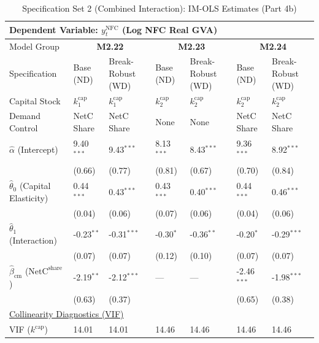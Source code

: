 \begin{table}[H]
\centering
\caption{Specification Set 2 (Combined Interaction): IM-OLS Estimates (Part 4b)}
\label{tab:spec_set_2_p4b}
\scriptsize
\begin{tabular}{p{3.8cm}p{2.1cm}p{2.1cm}p{2.1cm}p{2.1cm}p{2.1cm}p{2.1cm}}
\toprule
\multicolumn{7}{l}{\textbf{Dependent Variable: $y_t^{\text{NFC}}$ (Log NFC Real GVA)}} \\
\midrule
Model Group & \multicolumn{2}{c}{\textbf{M2.22}} & \multicolumn{2}{c}{\textbf{M2.23}} & \multicolumn{2}{c}{\textbf{M2.24}}  \\
Specification & Base (ND) & Break-Robust (WD) & Base (ND) & Break-Robust (WD) & Base (ND) & Break-Robust (WD)  \\
Capital Stock & $k^{\text{cap}}_1$ & $k^{\text{cap}}_1$ & $k^{\text{cap}}_2$ & $k^{\text{cap}}_2$ & $k^{\text{cap}}_2$ & $k^{\text{cap}}_2$  \\
Demand Control & NetC Share & NetC Share & None & None & NetC Share & NetC Share  \\
\midrule
$\hat{\alpha}$ (Intercept)  & 9.40$^{***}$ & 9.43$^{***}$ & 8.13$^{***}$ & 8.43$^{***}$ & 9.36$^{***}$ & 8.92$^{***}$  \\
 & {\scriptsize (0.66)} & {\scriptsize (0.77)} & {\scriptsize (0.81)} & {\scriptsize (0.67)} & {\scriptsize (0.70)} & {\scriptsize (0.84)}  \\
[1ex]
$\hat{\theta}_0$ (Capital Elasticity)  & 0.44$^{***}$ & 0.43$^{***}$ & 0.43$^{***}$ & 0.40$^{***}$ & 0.44$^{***}$ & 0.46$^{***}$  \\
 & {\scriptsize (0.04)} & {\scriptsize (0.06)} & {\scriptsize (0.07)} & {\scriptsize (0.06)} & {\scriptsize (0.04)} & {\scriptsize (0.06)}  \\
$\hat{\theta}_1$ (Interaction)  & -0.23$^{**}$ & -0.31$^{***}$ & -0.30$^{*}$ & -0.36$^{**}$ & -0.20$^{*}$ & -0.29$^{***}$  \\
 & {\scriptsize (0.07)} & {\scriptsize (0.07)} & {\scriptsize (0.12)} & {\scriptsize (0.10)} & {\scriptsize (0.07)} & {\scriptsize (0.07)}  \\
$\hat{\beta}_{\text{cm}}$ ($\text{NetC}^{\text{share}}$)  & -2.19$^{**}$ & -2.12$^{***}$ & --- & --- & -2.46$^{***}$ & -1.98$^{***}$  \\
 & {\scriptsize (0.63)} & {\scriptsize (0.37)} &  &  & {\scriptsize (0.65)} & {\scriptsize (0.38)}  \\
\midrule
\multicolumn{7}{l}{\underline{Collinearity Diagnostics (VIF)}} \\
VIF ($k^{\text{cap}}$) & 14.01 & 14.01 & 14.46 & 14.46 & 14.46 & 14.46  \\

\end{tabular}
\end{table}
